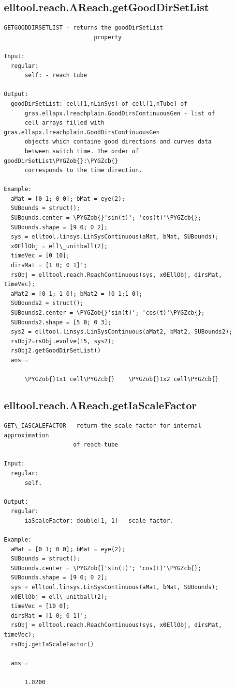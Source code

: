 \documentclass[letterpaper,10pt,english]{sphinxmanual}
\def\PYGZob{\char`\{}
\def\PYGZcb{\char`\}}
\begin{document}
\subsection{elltool.reach.AReach.getGoodDirSetList}
\label{chap_functions:elltool-reach-areach-getgooddirsetlist}
\begin{Verbatim}[commandchars=\\\{\}]
GETGOODDIRSETLIST - returns the goodDirSetList
                          property

Input:
  regular:
      self: - reach tube

Output:
  goodDirSetList: cell[1,nLinSys] of cell[1,nTube] of
      gras.ellapx.lreachplain.GoodDirsContinuousGen - list of
      cell arrays filled with gras.ellapx.lreachplain.GoodDirsContinuousGen
      objects which containe good directions and curves data
      between switch time. The order of goodDirSetList\PYGZob{}:\PYGZcb{}
      corresponds to the time direction.

Example:
  aMat = [0 1; 0 0]; bMat = eye(2);
  SUBounds = struct();
  SUBounds.center = \PYGZob{}'sin(t)'; 'cos(t)'\PYGZcb{};
  SUBounds.shape = [9 0; 0 2];
  sys = elltool.linsys.LinSysContinuous(aMat, bMat, SUBounds);
  x0EllObj = ell\_unitball(2);
  timeVec = [0 10];
  dirsMat = [1 0; 0 1]';
  rsObj = elltool.reach.ReachContinuous(sys, x0EllObj, dirsMat, timeVec);
  aMat2 = [0 1; 1 0]; bMat2 = [0 1;1 0];
  SUBounds2 = struct();
  SUBounds2.center = \PYGZob{}'sin(t)'; 'cos(t)'\PYGZcb{};
  SUBounds2.shape = [5 0; 0 3];
  sys2 = elltool.linsys.LinSysContinuous(aMat2, bMat2, SUBounds2);
  rsObj2=rsObj.evolve(15, sys2);
  rsObj2.getGoodDirSetList()
  ans =

      \PYGZob{}1x1 cell\PYGZcb{}    \PYGZob{}1x2 cell\PYGZcb{}
\end{Verbatim}


\subsection{elltool.reach.AReach.getIaScaleFactor}
\label{chap_functions:elltool-reach-areach-getiascalefactor}
\begin{Verbatim}[commandchars=\\\{\}]
GET\_IASCALEFACTOR - return the scale factor for internal approximation
                    of reach tube

Input:
  regular:
      self.

Output:
  regular:
      iaScaleFactor: double[1, 1] - scale factor.

Example:
  aMat = [0 1; 0 0]; bMat = eye(2);
  SUBounds = struct();
  SUBounds.center = \PYGZob{}'sin(t)'; 'cos(t)'\PYGZcb{};
  SUBounds.shape = [9 0; 0 2];
  sys = elltool.linsys.LinSysContinuous(aMat, bMat, SUBounds);
  x0EllObj = ell\_unitball(2);
  timeVec = [10 0];
  dirsMat = [1 0; 0 1]';
  rsObj = elltool.reach.ReachContinuous(sys, x0EllObj, dirsMat, timeVec);
  rsObj.getIaScaleFactor()

  ans =

      1.0200
\end{Verbatim}
\end{document}
